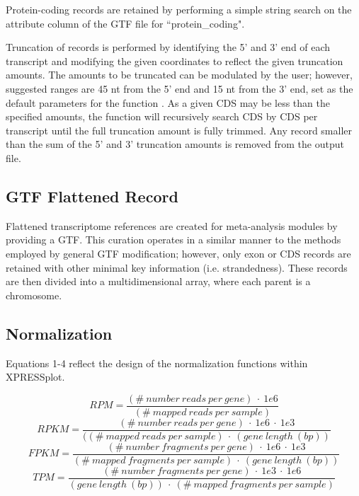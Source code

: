 \documentclass[11pt, a4paper, oneside]{article}
\begin{document}
Protein-coding records are retained by performing a simple string search on the attribute column of the GTF file for ``protein\_coding". \par

Truncation of records is performed by identifying the 5' and 3' end of each transcript and modifying the given coordinates to reflect the given truncation amounts. The amounts to be truncated can be modulated by the user; however, suggested ranges are 45 nt from the 5' end and 15 nt from the 3' end, set as the default parameters for the function \cite{ingolia_meth}. As a given CDS may be less than the specified amounts, the function will recursively search CDS by CDS per transcript until the full truncation amount is fully trimmed. Any record smaller than the sum of the 5' and 3' truncation amounts is removed from the output file. \par

\subsection{GTF Flattened Record}
Flattened transcriptome references are created for meta-analysis modules by providing a GTF. This curation operates in a similar manner to the methods employed by general GTF modification; however, only exon or CDS records are retained with other minimal key information (i.e. strandedness). These records are then divided into a multidimensional array, where each parent is a chromosome. \par

\subsection{Normalization}
Equations 1-4 reflect the design of the normalization functions within XPRESSplot.

  \begin{equation}
    RPM = \frac{(\#\ number\ reads\ per\ gene)\ \cdot\ 1e6}{(\#\ mapped\ reads\ per\ sample)}
  \end{equation}
  \begin{equation}
    RPKM = \frac{(\#\ number\ reads\ per\ gene)\ \cdot\ 1e6\ \cdot\ 1e3}{((\#\ mapped\ reads\ per\ sample)\ \cdot\ (gene\ length\ (bp))}
  \end{equation}
  \begin{equation}
    FPKM = \frac{(\#\ number\ fragments\ per\ gene)\ \cdot\ 1e6\ \cdot\ 1e3}{(\#\ mapped\ fragments\ per\ sample)\ \cdot\ (gene\ length\ (bp))}
  \end{equation}
  \begin{equation}
    TPM = \frac{(\#\ number\ fragments\ per\ gene)\ \cdot\ 1e3\ \cdot\ 1e6}{(gene\ length\ (bp))\ \cdot\ (\#\ mapped\ fragments\ per\ sample)}
  \end{equation}
\end{document}
